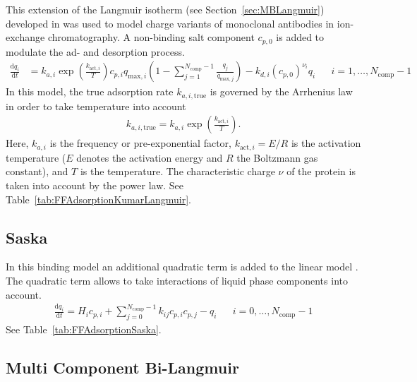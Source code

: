 This extension of the Langmuir isotherm (see Section~\ref{sec:MBLangmuir}) developed in \cite{Kumar2015} was used to model charge variants of monoclonal antibodies in ion-exchange chromatography. 
A non-binding salt component $c_{p,0}$ is added to modulate the ad- and desorption process.
\begin{align*}
  \frac{\mathrm{d} q_i}{\mathrm{d} t} &= k_{a,i} \exp\left( \frac{k_{\text{act},i}}{T} \right) c_{p,i} q_{\text{max},i} \left( 1 - \sum_{j=1}^{N_{\text{comp}} - 1} \frac{q_j}{q_{\text{max},j}} \right) - k_{d,i} \left( c_{p,0} \right)^{\nu_i} q_i && i = 1, \dots, N_{\text{comp}} - 1
\end{align*}
In this model, the true adsorption rate $k_{a,i,\text{true}}$ is governed by the Arrhenius law in order to take temperature into account
\begin{align*}
  k_{a,i,\text{true}} = k_{a,i} \exp\left( \frac{k_{\text{act},i}}{T} \right).
\end{align*}
Here, $k_{a,i}$ is the frequency or pre-exponential factor, $k_{\text{act},i} = E / R$ is the activation temperature ($E$ denotes the activation energy and $R$ the Boltzmann gas constant), and $T$ is the temperature.
The characteristic charge $\nu$ of the protein is taken into account by the power law.
See Table~\ref{tab:FFAdsorptionKumarLangmuir}.

\subsection{Saska}

In this binding model an additional quadratic term is added to the linear model \cite{Saska1992}. 
The quadratic term allows to take interactions of liquid phase components into account.
\begin{align*}
  \frac{\mathrm{d} q_i}{\mathrm{d} t} = H_i c_{p,i} + \sum_{j=0}^{N_{\text{comp}} - 1} k_{ij} c_{p,i} c_{p,j} - q_i && i = 0, \dots, N_{\text{comp}} - 1
\end{align*}
See Table~\ref{tab:FFAdsorptionSaska}.

\subsection{Multi Component Bi-Langmuir}\label{sec:MBBiLangmuir}

